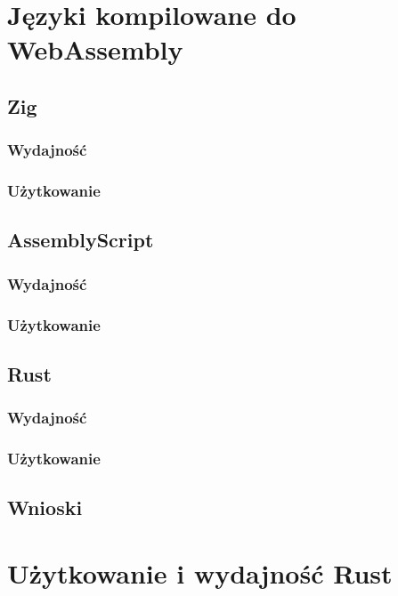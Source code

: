\documentclass[language=polish,type=master]{aghmodern}
\begin{document}
\chapter{Języki kompilowane do WebAssembly}

\section{Zig}

\subsection{Wydajność}

\subsection{Użytkowanie}

\section{AssemblyScript}

\subsection{Wydajność}

\subsection{Użytkowanie}

\section{Rust}

\subsection{Wydajność}

\subsection{Użytkowanie}

\section{Wnioski}

\chapter{Użytkowanie i wydajność Rust}
\end{document}
